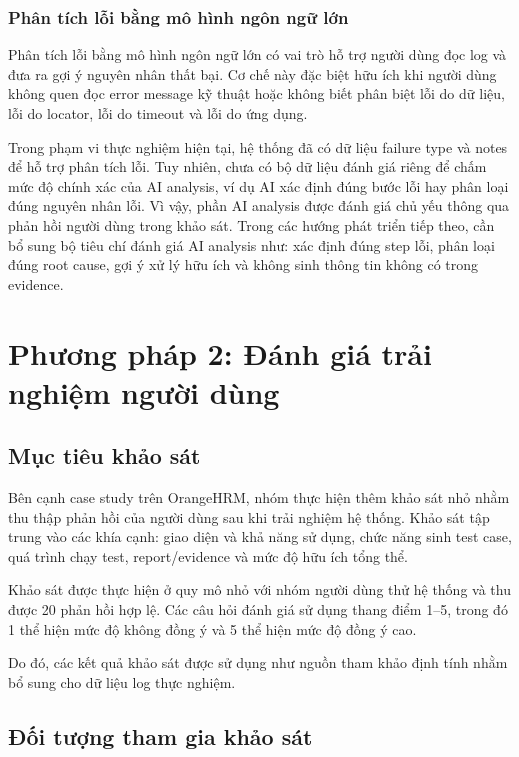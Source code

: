 \subsubsection{Phân tích lỗi bằng mô hình ngôn ngữ lớn}

Phân tích lỗi bằng mô hình ngôn ngữ lớn có vai trò hỗ trợ người dùng đọc log và đưa ra gợi ý nguyên nhân thất bại. Cơ chế này đặc biệt hữu ích khi người dùng không quen đọc error message kỹ thuật hoặc không biết phân biệt lỗi do dữ liệu, lỗi do locator, lỗi do timeout và lỗi do ứng dụng.

Trong phạm vi thực nghiệm hiện tại, hệ thống đã có dữ liệu failure type và notes để hỗ trợ phân tích lỗi. Tuy nhiên, chưa có bộ dữ liệu đánh giá riêng để chấm mức độ chính xác của AI analysis, ví dụ AI xác định đúng bước lỗi hay phân loại đúng nguyên nhân lỗi. Vì vậy, phần AI analysis được đánh giá chủ yếu thông qua phản hồi người dùng trong khảo sát. Trong các hướng phát triển tiếp theo, cần bổ sung bộ tiêu chí đánh giá AI analysis như: xác định đúng step lỗi, phân loại đúng root cause, gợi ý xử lý hữu ích và không sinh thông tin không có trong evidence.

\section{Phương pháp 2: Đánh giá trải nghiệm người dùng}

\subsection{Mục tiêu khảo sát}

Bên cạnh case study trên OrangeHRM, nhóm thực hiện thêm khảo sát nhỏ nhằm thu thập phản hồi của người dùng sau khi trải nghiệm hệ thống. Khảo sát tập trung vào các khía cạnh: giao diện và khả năng sử dụng, chức năng sinh test case, quá trình chạy test, report/evidence và mức độ hữu ích tổng thể.

Khảo sát được thực hiện ở quy mô nhỏ với nhóm người dùng thử hệ thống và thu được 20 phản hồi hợp lệ. Các câu hỏi đánh giá sử dụng thang điểm 1--5, trong đó 1 thể hiện mức độ không đồng ý và 5 thể hiện mức độ đồng ý cao.

Do đó, các kết quả khảo sát được sử dụng như nguồn tham khảo định tính nhằm bổ sung cho dữ liệu log thực nghiệm.

\subsection{Đối tượng tham gia khảo sát}

